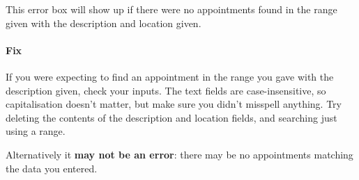 This error box will show up if there were no appointments found in the range
given with the description and location given.

\paragraph{Fix}
If you were expecting to find an appointment in the range you gave with the
description given, check your inputs. The text fields are case-insensitive, so
capitalisation doesn't matter, but make sure you didn't misspell anything. Try
deleting the contents of the description and location fields, and searching just
using a range.

Alternatively it \textbf{may not be an error}: there may be no appointments
matching the data you entered.
